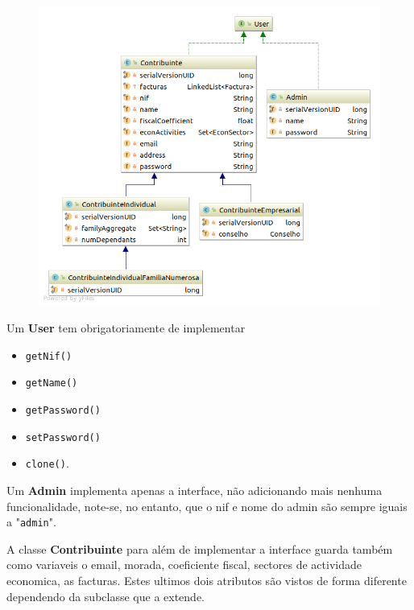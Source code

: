 \documentclass[10pt,a4paper]{article}
\begin{document}
    \begin{figure}[h]
        \includegraphics[width=\textwidth]{./images/UserHierarquy.png}
    \end{figure}

    Um \textbf{User} tem obrigatoriamente de implementar
    \begin{multicols}{3}
    \begin{itemize}
        \item \texttt{getNif()}
        \item \texttt{getName()}
        \item \texttt{getPassword()}
        \item \texttt{setPassword()}
        \item \texttt{clone()}.
    \end{itemize}
    \end{multicols}
    Um \textbf{Admin} implementa apenas a interface, não adicionando mais
    nenhuma funcionalidade, note-se, no entanto, que o nif e nome do admin são
    sempre iguais a "\texttt{admin}".

    A classe \textbf{Contribuinte} para além de implementar a interface
    guarda também como variaveis o email, morada, coeficiente fiscal, sectores
    de actividade economica, as facturas. Estes ultimos dois atributos são
    vistos de forma diferente dependendo da subclasse que a extende.
\end{document}
